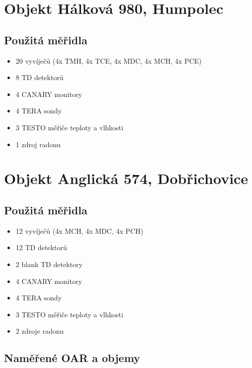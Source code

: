 
\section{Objekt Hálková 980, Humpolec}
\subsection{Použitá měřidla}
\begin{itemize}
    \setlength\itemsep{0em}
	\item 20 vyvíječů (4x TMH, 4x TCE, 4x MDC, 4x MCH, 4x PCE)
	\item 8 TD detektorů
	\item 4 CANARY monitory
	\item 4 TERA sondy
	\item 3 TESTO měřiče teploty a vlhkosti
	\item 1 zdroj radonu
\end{itemize}

\section{Objekt Anglická 574, Dobřichovice}
\subsection{Použitá měřidla}
\begin{itemize}
    \setlength\itemsep{0em}
	\item 12 vyvíječů (4x MCH, 4x MDC, 4x PCH)
	\item 12 TD detektorů
	\item 2 blank TD detektory 
	\item 4 CANARY monitory
	\item 4 TERA sondy
	\item 3 TESTO měřiče teploty a vlhkosti
	\item 2 zdroje radonu
\end{itemize}

\subsection{Naměřené OAR a objemy}


